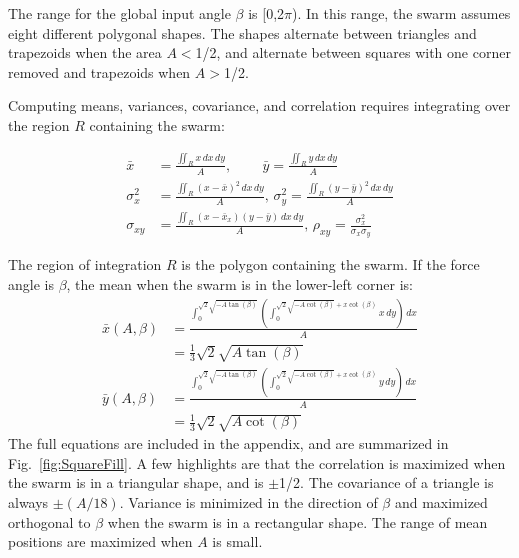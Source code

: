 The range for the global input angle $\beta $ is [0,2$\pi $). In this range, the swarm assumes eight different polygonal shapes. The shapes alternate between triangles and trapezoids when the area $A$$<$1/2, and alternate between squares with one corner removed and trapezoids when $A$$>$1/2.

Computing means, variances, covariance, and correlation requires integrating over the region $R$ containing the swarm:  %

\begin{align}
\bar{x} &=\frac{\iint_R x \,dx\,dy}{A} \label{eq:meanInSquareWorkspace}
\text{, }\qquad \bar{y}=\frac{\iint_R y \,dx\,dy}{A} \\
\sigma^2_x &=\frac{\iint_R \left(x-\bar{x}\right)^2  \,dx \,dy}{A}  \label{eq:varInSquareWorkspace}
\text{, } \sigma^2_y =\frac{\iint_R  \left(y-\bar{y}\right)^2 \,dx \,dy}{A}\\
\sigma_{xy} &= \frac{\iint_R  \left(x-\bar{x}_x\right) \left(y-\bar{y}\right) \, dx \,dy}{A} \label{eq:covAndcorrInSquareWorkspace}
\text{, }\rho_{xy} = \frac{\sigma^2_x}{\sigma_x\sigma_y}
\end{align}

The region of integration $R$ is the polygon containing the swarm. If the force angle is $\beta$, the mean when the swarm is in the lower-left corner is:
\begin{align}\label{eq:meanInSquareWorkspaceLL}
\bar{x}(A,\beta) &= \frac{\int_0^{\sqrt{2} \sqrt{-A \tan (\beta )}} \left(\int_0^{\sqrt{2} \sqrt{-A \cot (\beta )}+x \cot (\beta )} x \, dy\right) \, dx}{A} \nonumber \\
	&=\frac{1}{3} \sqrt{2} \sqrt{A \tan (\beta )}\\
\bar{y}(A,\beta) &= \frac{\int_0^{\sqrt{2} \sqrt{-A \tan (\beta )}} \left(\int_0^{\sqrt{2} \sqrt{-A \cot (\beta )}+x \cot (\beta )} y \, dy\right) \, dx}{A} \nonumber\\
	&=\frac{1}{3} \sqrt{2} \sqrt{A \cot (\beta )}
\end{align}
The full equations are included in the appendix, and are summarized in Fig.~\ref{fig:SquareFill}. A few highlights are that the correlation is maximized when the swarm is in a triangular shape, and is $\pm$1/2. The covariance of a triangle is always $\pm(A/18)$. Variance is minimized in the direction of $\beta$ and maximized orthogonal to $\beta$ when the swarm is in a rectangular shape. The range of mean positions are maximized when $A$ is small.


